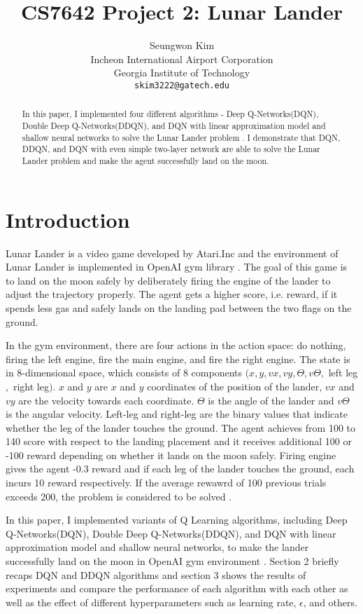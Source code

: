 \documentclass{article}
\title{CS7642 Project 2: Lunar Lander}
\author{%
  Seungwon Kim\\
  Incheon International Airport Corporation\\
  Georgia Institute of Technology\\
  \texttt{skim3222@gatech.edu} \\
}
\begin{document}
\maketitle
\thispagestyle{fancy}

\begin{abstract}
In this paper, I implemented four different algorithms - Deep Q-Networks(DQN), Double Deep Q-Networks(DDQN), and DQN with linear approximation model and shallow neural networks to solve the Lunar Lander problem \cite{hessel2018rainbow, mnih2015human, openailunar, van2016deep}. I demonstrate that DQN, DDQN, and DQN with even simple two-layer network are able to solve the Lunar Lander problem and make the agent successfully land on the moon. 
\end{abstract}

\section{Introduction}
Lunar Lander is a video game developed by Atari.Inc and the environment of Lunar Lander is implemented in OpenAI gym library \cite{openailunar, atariwiki}. The goal of this game is to land on the moon safely by deliberately firing the engine of the lander to adjust the trajectory properly. The agent gets a higher score, i.e. reward, if it spends less gas and safely lands on the landing pad between the two flags on the ground.

In the gym environment, there are four actions in the action space: do nothing, firing the left engine, fire the main engine, and fire the right engine. The state is in 8-dimensional space, which consists of 8 components $ (x, y, vx, vy, \Theta, v\Theta,$ left leg$,$ right leg$)$. $x$ and $y$ are $x$ and $y$ coordinates of the position of the lander, $vx$ and $vy$ are the velocity towards each coordinate. $\Theta$ is the angle of the lander and $v\Theta$ is the angular velocity. Left-leg and right-leg are the binary values that indicate whether the leg of the lander touches the ground. The agent achieves from 100 to 140 score with respect to the landing placement and it receives additional 100 or -100 reward depending on whether it lands on the moon safely. Firing engine gives the agent -0.3 reward and if each leg of the lander touches the ground, each incurs 10 reward respectively. If the average rewawrd of 100 previous trials exceeds 200, the problem is considered to be solved \cite{openailunar}.

In this paper, I implemented variants of Q Learning algorithms, including Deep Q-Networks(DQN), Double Deep Q-Networks(DDQN), and DQN with linear approximation model and shallow neural networks, to make the lander successfully land on the moon in OpenAI gym environment \cite{hessel2018rainbow, mnih2015human, openailunar, van2016deep}. Section 2 briefly recaps DQN and DDQN algorithms and section 3 shows the results of experiments and compare the performance of each algorithm with each other as well as the effect of different hyperparameters such as learning rate, $\epsilon$, and others.
\end{document}
